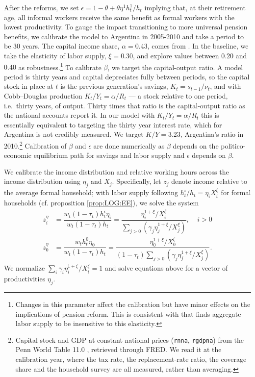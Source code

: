 After the reforms, we set $\epsilon=1-\theta+\theta \eta^1h_t^1/h_t$ implying that, at their retirement age, all informal workers receive the same benefit as formal workers with the lowest productivity. To gauge the impact transitioning to more universal pension benefits, we calibrate the model to Argentina in 2005-2010 and take a period to be 30 years. The capital income share, $\alpha=0.43$, comes from \textcite{Frankema}. In the baseline, we take the elasticity of labor supply, $\xi=0.30$, and explore values between $0.20$ and $0.40$ as robustness.\footnote{Changes in this parameter affect the calibration but have minor effects on the implications of pension reform. This is consistent with \textcite{Imrohoroglu} that finds aggregate labor supply to be insensitive to this elasticity.} To calibrate $\beta$, we target the capital-output ratio. A model period is thirty years and capital depreciates fully between periods, so the capital stock in place at $t$ is the previous generation's savings, $K_t = s_{t-1}/\nu_t$, and with Cobb--Douglas production $K_t/Y_t = \alpha/R_t$ --- a stock relative to one period, i.e.\ thirty years, of output. Thirty times that ratio is the capital-output ratio as the national accounts report it. In our model with $K_t/Y_t = \alpha / R_t$ this is essentially equivalent to targeting the thirty year interest rate, which for Argentina is not credibly measured. We target $K/Y = 3.23$, Argentina's ratio in 2010.\footnote{Capital stock and GDP at constant national prices (\texttt{rnna}, \texttt{rgdpna}) from the Penn World Table 11.0 \parencite{pwt}, retrieved through FRED. We read it at the calibration year, where the tax rate, the replacement-rate ratio, the coverage share and the household survey are all measured, rather than averaging.} Calibration of $\beta$ and $\epsilon$ are done numerically as $\beta$ depends on the politico-economic equilibrium path for savings and labor supply and $\epsilon$ depends on $\beta$.



We calibrate the income distribution and relative working hours across the income distribution using $\eta_j$ and $X_j$. Specifically, let $z_j$ denote income relative to the average formal household; with labor supply following $h_t^i/h_t = \eta_iX_i^{\xi}$ for formal households (cf. proposition \ref{prop:LOG:EE}), we solve the system
\begin{align}\label{eq:calibration_eta}
        z_i^{\eta} &= \dfrac{w_t(1-\tau_t)h_t^i \eta_i}{w_t(1-\tau_t)h_t} = \dfrac{\eta_i^{1+\xi}/X_i^{\xi}}{\sum_{j>0} \left(\gamma_ j\eta_j^{1+\xi}/X_j^{\xi}\right)}, \ \ \ \ \ i>0\\
         z_0^{\eta} &= \dfrac{w_t h_t^0 \eta_0}{w_t(1-\tau_t)h_t} = \dfrac{\eta_0^{1+\xi}/X_0^{\xi}}{(1-\tau_t)\sum_{j>0} \left(\gamma_ j\eta_j^{1+\xi}/X_j^{\xi}\right)}. \nonumber
    \end{align}
We normalize $\sum_i \gamma_i\eta_i^{1+\xi}/X_i^{\xi} = 1$ and solve equations above for a vector of productivities $\eta_j$.

